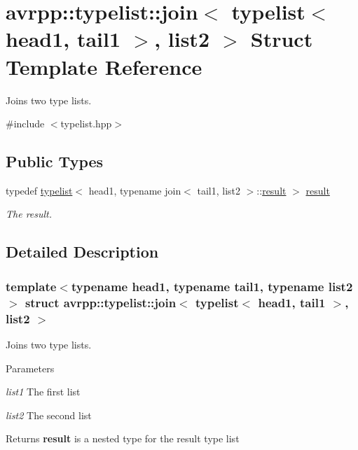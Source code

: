 \hypertarget{structavrpp_1_1typelist_1_1join_3_01typelist_3_01head1_00_01tail1_01_4_00_01list2_01_4}{
\section{avrpp::typelist::join$<$ typelist$<$ head1, tail1 $>$, list2 $>$ Struct Template Reference}
\label{structavrpp_1_1typelist_1_1join_3_01typelist_3_01head1_00_01tail1_01_4_00_01list2_01_4}
}


Joins two type lists.  




{\ttfamily \#include $<$typelist.hpp$>$}

\subsection*{Public Types}
\begin{DoxyCompactItemize}
\item 
typedef \hyperlink{structavrpp_1_1typelist_1_1typelist}{typelist}$<$ head1, typename join$<$ tail1, list2 $>$::\hyperlink{structavrpp_1_1typelist_1_1typelist}{result} $>$ \hyperlink{structavrpp_1_1typelist_1_1join_3_01typelist_3_01head1_00_01tail1_01_4_00_01list2_01_4_a1f21b80468444f4b68737771e19cb8fb}{result}
\begin{DoxyCompactList}\small\item\em The result. \item\end{DoxyCompactList}\end{DoxyCompactItemize}


\subsection{Detailed Description}
\subsubsection*{template$<$typename head1, typename tail1, typename list2$>$ struct avrpp::typelist::join$<$ typelist$<$ head1, tail1 $>$, list2 $>$}

Joins two type lists. 
\begin{DoxyParams}{Parameters}
\item[{\em list1}]The first list \item[{\em list2}]The second list \end{DoxyParams}
\begin{DoxyReturn}{Returns}
{\bfseries result} is a nested type for the result type list 
\end{DoxyReturn}


